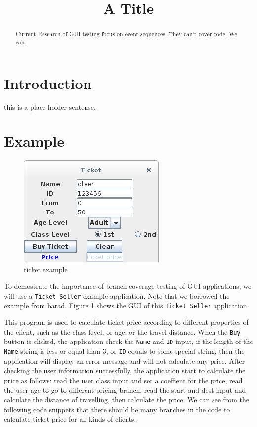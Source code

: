 \documentclass{article}
\begin{document}
\title{A Title}


\maketitle

\begin{abstract}
  Current Research of GUI testing focus on event sequences.
  They can't cover code.
  We can.
\end{abstract}

\section{Introduction}\label{section:introduction}
this is a place holder sentense.

\section{Example}

\begin{figure}
  \centering
  \caption{ticket example}
  \includegraphics{./res/ticket.png}
\end{figure}

To demostrate  the importance of branch coverage testing of GUI applications, we will use a  \texttt{Ticket Seller} example application. Note that we borrowed the example from barad. Figure 1 shows the GUI of this \texttt{Ticket Seller} application.

This program is used to calculate ticket price according to different properties of the client, such as the class level, or age, or the travel distance. When the \texttt{Buy} button is clicked, the application check the \texttt{Name} and \texttt{ID} input, if the length of the \texttt{Name} string is less or equal than 3, or \texttt{ID} equals to some special string, then the application will display an error message and will not calculate any price. After checking the user information successfully, the application start to calculate the price as follows: read the user class input and set a coeffient for the price, read the user age to go to different pricing branch, read the start and dest input and calculate the distance of travelling, then calculate the price. We can see from the following code snippets that there should be many branches in the code to calculate ticket price for all kinds of clients.
\end{document}
